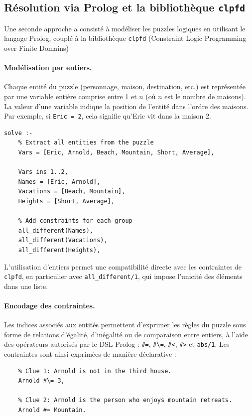 \documentclass[a4paper,11pt]{article}
\begin{document}
\subsection{Résolution via Prolog et la bibliothèque \texttt{clpfd}}

Une seconde approche a consisté à modéliser les puzzles logiques en utilisant le langage Prolog, couplé à la bibliothèque \texttt{clpfd} (Constraint Logic Programming over Finite Domains)

\paragraph{Modélisation par entiers.}
Chaque entité du puzzle (personnage, maison, destination, etc.) est représentée par une variable entière comprise entre 1 et $n$ (où $n$ est le nombre de maisons). La valeur d'une variable indique la position de l’entité dans l’ordre des maisons. Par exemple, si \texttt{Eric = 2}, cela signifie qu’Eric vit dans la maison 2.

\begin{verbatim}
solve :-
    % Extract all entities from the puzzle
    Vars = [Eric, Arnold, Beach, Mountain, Short, Average],

    Vars ins 1..2,
    Names = [Eric, Arnold],
    Vacations = [Beach, Mountain],
    Heights = [Short, Average],

    % Add constraints for each group
    all_different(Names),
    all_different(Vacations),
    all_different(Heights),
\end{verbatim}

L'utilisation d’entiers permet une compatibilité directe avec les contraintes de \texttt{clpfd}, en particulier avec \texttt{all\_different/1}, qui impose l’unicité des éléments dans une liste.

\paragraph{Encodage des contraintes.}
Les indices associés aux entités permettent d’exprimer les règles du puzzle sous forme de relations d’égalité, d’inégalité ou de comparaison entre entiers, à l’aide des opérateurs autorisés par le DSL Prolog : \texttt{\#=}, \texttt{\#\textbackslash=}, \texttt{\#<}, \texttt{\#>} et \texttt{abs/1}. Les contraintes sont ainsi exprimées de manière déclarative :

\begin{verbatim}
    % Clue 1: Arnold is not in the third house.
    Arnold #\= 3,

    % Clue 2: Arnold is the person who enjoys mountain retreats.
    Arnold #= Mountain.
\end{verbatim}
\end{document}
